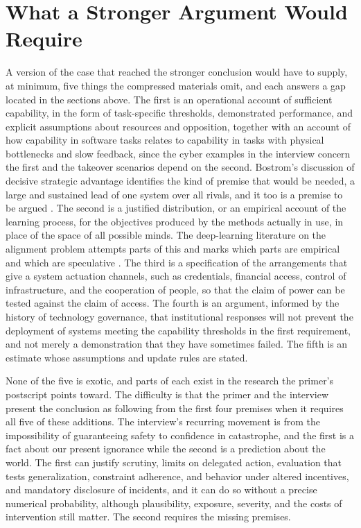\documentclass[11pt]{article}
\begin{document}
\section{What a Stronger Argument Would Require}

A version of the case that reached the stronger conclusion would have to supply, at minimum, five things the compressed materials omit, and each answers a gap located in the sections above. The first is an operational account of sufficient capability, in the form of task-specific thresholds, demonstrated performance, and explicit assumptions about resources and opposition, together with an account of how capability in software tasks relates to capability in tasks with physical bottlenecks and slow feedback, since the cyber examples in the interview concern the first and the takeover scenarios depend on the second. Bostrom's discussion of decisive strategic advantage identifies the kind of premise that would be needed, a large and sustained lead of one system over all rivals, and it too is a premise to be argued \citeyearpar{bostrom2014}. The second is a justified distribution, or an empirical account of the learning process, for the objectives produced by the methods actually in use, in place of the space of all possible minds. The deep-learning literature on the alignment problem attempts parts of this and marks which parts are empirical and which are speculative \citep{ngo2022}. The third is a specification of the arrangements that give a system actuation channels, such as credentials, financial access, control of infrastructure, and the cooperation of people, so that the claim of power can be tested against the claim of access. The fourth is an argument, informed by the history of technology governance, that institutional responses will not prevent the deployment of systems meeting the capability thresholds in the first requirement, and not merely a demonstration that they have sometimes failed. The fifth is an estimate whose assumptions and update rules are stated.

None of the five is exotic, and parts of each exist in the research the primer's postscript points toward. The difficulty is that the primer and the interview present the conclusion as following from the first four premises when it requires all five of these additions. The interview's recurring movement is from the impossibility of guaranteeing safety to confidence in catastrophe, and the first is a fact about our present ignorance while the second is a prediction about the world. The first can justify scrutiny, limits on delegated action, evaluation that tests generalization, constraint adherence, and behavior under altered incentives, and mandatory disclosure of incidents, and it can do so without a precise numerical probability, although plausibility, exposure, severity, and the costs of intervention still matter. The second requires the missing premises.
\end{document}
